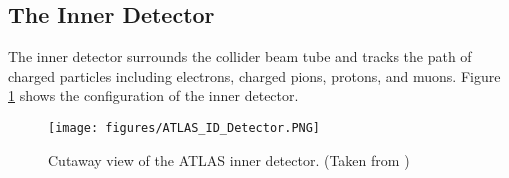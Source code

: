 \subsection{The Inner Detector}
\label{LHC:ID}
\indent The inner detector surrounds the collider beam tube and tracks the path of charged particles including electrons, charged pions, protons, and muons. Figure \ref{LHC:fig:ATLASID} shows the configuration of the inner detector. ~\\
\begin{figure}[h!]
\centering
\texttt{[image: figures/ATLAS\_ID\_Detector.PNG]}
\caption{ Cutaway view of the ATLAS inner detector.  (Taken from \cite{biblio:JINST}) \label{LHC:fig:ATLASID}}
\end{figure}

